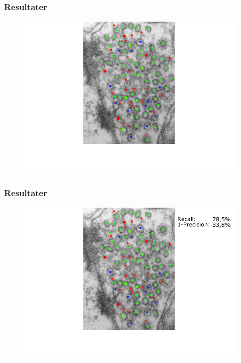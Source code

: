 \documentclass[12pt,t]{beamer}
\begin{document}
\begin{frame}
\frametitle{Resultater}
\begin{figure}[H]
	\centering
	\includegraphics[scale=0.4]{img/afstand/res_3.png}
\end{figure}
\end{frame}

\begin{frame}
\frametitle{Resultater}
\begin{figure}[H]
	\centering
	\includegraphics[scale=0.4]{img/afstand/res_4.png}
\end{figure}
\end{frame}
\end{document}
